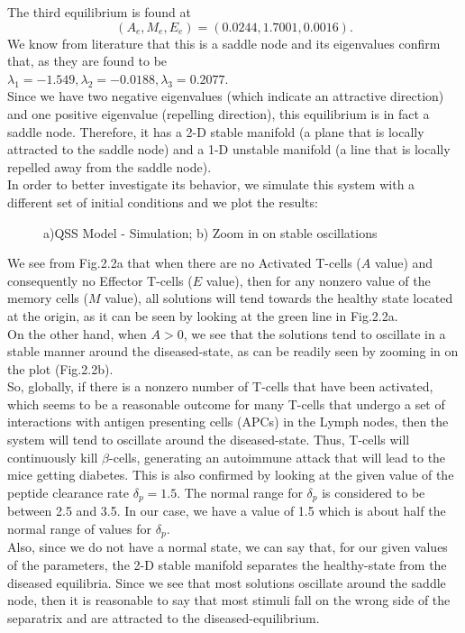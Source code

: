 The third equilibrium is found at
$$
(A_{e},M_{e},E_{e})= (0.0244,1.7001,0.0016).
$$
We know from literature that this is a saddle node and its eigenvalues confirm that, as they are found to be\\
$\lambda_{1}=-1.549, \lambda_{2}=-0.0188, \lambda_{3}=0.2077$.\\
Since we have two negative eigenvalues (which indicate an attractive direction) and one positive eigenvalue (repelling direction), this equilibrium is in fact a saddle node. Therefore, it has a 2-D stable manifold (a plane that is locally attracted to the saddle node) and a 1-D unstable manifold (a line that is locally repelled away from the saddle node).\\
In order to better investigate its behavior, we simulate this system with a different set of initial conditions and we plot the results:

\begin{figure}[H]
	\caption{a)QSS Model - Simulation; b) Zoom in on stable oscillations}
\end{figure}

We see from Fig.2.2a that when there are no Activated T-cells ($A$ value) and consequently no Effector T-cells ($E$ value), then for any nonzero value of the memory cells ($M$ value), all solutions will tend towards the healthy state located at the origin, as it can be seen by looking at the green line in Fig.2.2a.\\
On the other hand, when $A> 0$, we see that the solutions tend to oscillate in a stable manner around the diseased-state, as can be readily seen by zooming in on the plot (Fig.2.2b).\\ So, globally, if there is a nonzero number of T-cells that have been activated, which seems to be a reasonable outcome for many T-cells that undergo a set of interactions with antigen presenting cells (APCs) in the Lymph nodes, then the system will tend to oscillate around the diseased-state. Thus, T-cells will continuously kill $\beta$-cells, generating an autoimmune attack that will lead to the mice getting diabetes. This is also confirmed by looking at the given value of the peptide clearance rate $\delta_{p}=1.5$. The normal range for $\delta_{p}$ is considered to be between 2.5 and 3.5. In our case, we have a value of 1.5 which is about half the normal range of values for $\delta_{p}$. \\
Also, since we do not have a normal state, we can say that, for our given values of the parameters, the 2-D stable manifold separates the healthy-state from the diseased equilibria. Since we see that most solutions oscillate around the saddle node, then it is reasonable to say that most stimuli fall on the wrong side of the separatrix and are attracted to the diseased-equilibrium.\\

